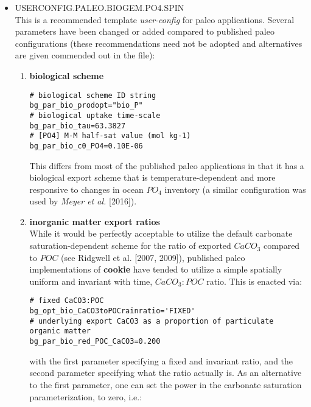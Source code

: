 \begin{itemize}[noitemsep]
\vspace{2mm}
\item \textsf{\small USERCONFIG.PALEO.BIOGEM.PO4.SPIN}
\vspace{1mm}
\\This is a recommended template \textit{user-config} for paleo applications. Several parameters have been changed or added compared to published paleo configurations (these recommendations need not be adopted and alternatives are given commended out in the file):
\begin{enumerate}[noitemsep]
\vspace{1mm}
\item \textbf{biological scheme}
\small\vspace{-1mm}\begin{verbatim}
# biological scheme ID string
bg_par_bio_prodopt="bio_P"
# biological uptake time-scale
bg_par_bio_tau=63.3827
# [PO4] M-M half-sat value (mol kg-1)
bg_par_bio_c0_PO4=0.10E-06
\end{verbatim}\vspace{-1mm}\normalsize
This differs from most of the published paleo applications in that it has a biological export scheme that is temperature-dependent and more responsive to changes in ocean \(PO_{4}\) inventory (a similar configuration was used by \textit{Meyer et al.} [2016]).
\vspace{1mm}
\item \textbf{inorganic matter export ratios}
\\While it would be perfectly acceptable to utilize the default carbonate saturation-dependent scheme for the ratio of exported \(CaCO_{3}\) compared to \(POC\) (see Ridgwell et al. [2007, 2009]), published paleo implementations of \textbf{cookie} have tended to utilize a simple spatially uniform and invariant with time, \(CaCO_{3}:POC\) ratio. This is enacted via:
\small\vspace{-1mm}\begin{verbatim}
# fixed CaCO3:POC
bg_opt_bio_CaCO3toPOCrainratio='FIXED'
# underlying export CaCO3 as a proportion of particulate organic matter
bg_par_bio_red_POC_CaCO3=0.200
\end{verbatim}\vspace{-1mm}\normalsize
with the first parameter specifying a fixed and invariant ratio, and the second parameter specifying what the ratio actually is. As an alternative to the first parameter, one can set the power in the carbonate saturation parameterization, to zero, i.e.:
\small\vspace{-1mm}\begin{verbatim}

\end{verbatim}
\end{enumerate}
\end{itemize}
